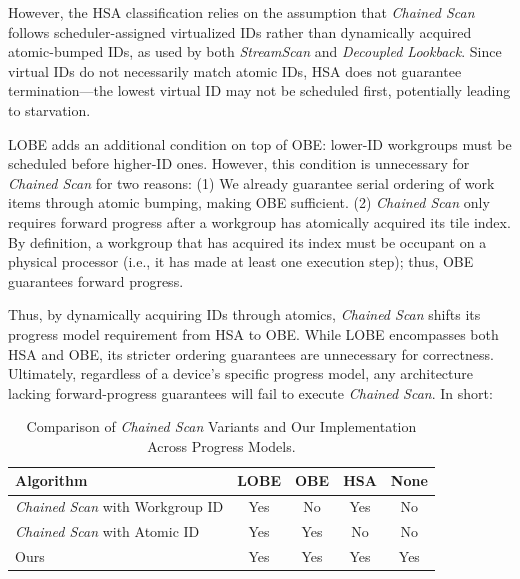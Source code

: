 \documentclass[acmsmall, manuscript, screen, review, anonymous]{acmart}
\begin{document}
However, the HSA classification relies on the assumption that \emph{Chained Scan} follows scheduler-assigned virtualized IDs rather than dynamically acquired atomic-bumped IDs, as used by both \emph{StreamScan} and \emph{Decoupled Lookback}. Since virtual IDs do not necessarily match atomic IDs, HSA does not guarantee termination---the lowest virtual ID may not be scheduled first, potentially leading to starvation.

LOBE adds an additional condition on top of OBE\@: lower-ID workgroups must be scheduled before higher-ID ones. However, this condition is unnecessary for \emph{Chained Scan} for two reasons: (1) We already guarantee serial ordering of work items through atomic bumping, making OBE sufficient. (2) \emph{Chained Scan} only requires forward progress after a workgroup has atomically acquired its tile index. By definition, a workgroup that has acquired its index must be occupant on a physical processor (i.e., it has made at least one execution step); thus, OBE guarantees forward progress.

Thus, by dynamically acquiring IDs through atomics, \emph{Chained Scan} shifts its progress model requirement from HSA to OBE. While LOBE encompasses both HSA and OBE, its stricter ordering guarantees are unnecessary for correctness. Ultimately, regardless of a device's specific progress model, any architecture lacking forward-progress guarantees will fail to execute \emph{Chained Scan}. In short:

\begin{table}[h!]
  \small
  \centering
  \begin{tabular}{lcccc}
    \toprule
    Algorithm                             & LOBE & OBE & HSA & None \\
    \midrule
    \emph{Chained Scan} with Workgroup ID & Yes  & No  & Yes & No   \\
    \emph{Chained Scan} with Atomic ID    & Yes  & Yes & No  & No   \\
    Ours                                  & Yes  & Yes & Yes & Yes  \\
    \bottomrule
  \end{tabular}
  \caption{Comparison of \emph{Chained Scan} Variants and Our Implementation Across Progress Models.\label{tab:progress_models}}
\end{table}
\end{document}

